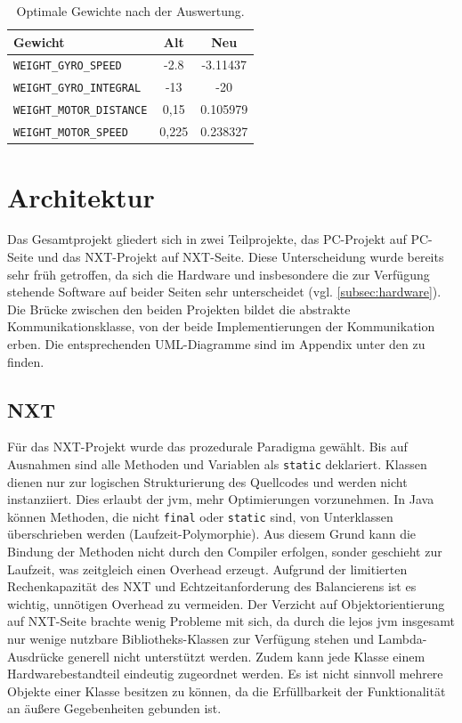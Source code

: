 \documentclass[oneside,abstractoff,a4paper]{scrartcl}
\begin{document}
\begin{table}
  \begin{center}\begin{tabular}{|l|c|c|}\hline 
  \textbf{Gewicht}&\textbf{Alt}&\textbf{Neu}\\\hline
  \texttt{WEIGHT\_GYRO\_SPEED}&-2.8&-3.11437\\
  \texttt{WEIGHT\_GYRO\_INTEGRAL}&-13&-20\\
  \texttt{WEIGHT\_MOTOR\_DISTANCE}&0,15&0.105979\\
  \texttt{WEIGHT\_MOTOR\_SPEED}&0,225&0.238327\\\hline
  \end{tabular}\end{center}
  \caption{Optimale Gewichte nach der Auswertung.}
  \label{tab:evo_result_final}
\end{table}

\section{Architektur}

Das Gesamtprojekt gliedert sich in zwei Teilprojekte, das PC-Projekt auf PC-Seite und das NXT-Projekt auf NXT-Seite. Diese Unterscheidung wurde bereits sehr früh getroffen, da sich die Hardware und insbesondere die zur Verfügung stehende Software auf beider Seiten sehr unterscheidet (vgl. \cref{subsec:hardware}). Die Brücke zwischen den beiden Projekten bildet die abstrakte Kommunikationsklasse, von der beide Implementierungen der Kommunikation erben. Die entsprechenden UML-Diagramme sind im Appendix unter den   zu finden.

\subsection{NXT}

Für das NXT-Projekt wurde das prozedurale Paradigma gewählt. Bis auf Ausnahmen sind alle Methoden und Variablen als \texttt{static} deklariert. Klassen dienen nur zur logischen Strukturierung des Quellcodes und werden nicht instanziiert. Dies erlaubt der \ac{jvm}, mehr Optimierungen vorzunehmen. In Java können Methoden, die nicht \texttt{final} oder \texttt{static} sind, von Unterklassen überschrieben werden (Laufzeit-Polymorphie). Aus diesem Grund kann die Bindung der Methoden nicht durch den Compiler erfolgen, sonder geschieht zur Laufzeit, was zeitgleich einen Overhead erzeugt. Aufgrund der limitierten Rechenkapazität des NXT und Echtzeitanforderung des Balancierens ist es wichtig, unnötigen Overhead zu vermeiden. Der Verzicht auf Objektorientierung auf NXT-Seite brachte wenig Probleme mit sich, da durch die \ac{lejos} \ac{jvm} insgesamt nur wenige nutzbare Bibliotheks-Klassen zur Verfügung stehen und Lambda-Ausdrücke generell nicht unterstützt werden. Zudem kann jede Klasse einem Hardwarebestandteil eindeutig zugeordnet werden. Es ist nicht sinnvoll mehrere Objekte einer Klasse besitzen zu können, da die Erfüllbarkeit der Funktionalität an äußere Gegebenheiten gebunden ist.
\end{document}
